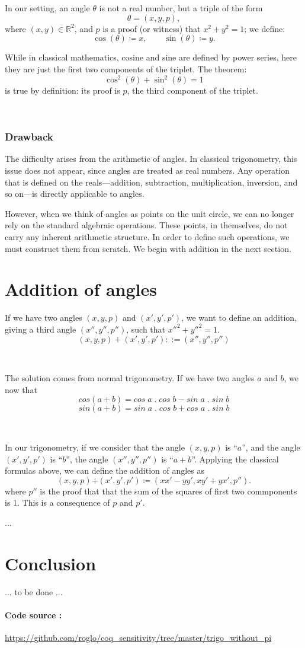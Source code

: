 \documentclass[11pt]{article}
\theoremstyle{definition}
\begin{document}
\

\

\noindent In our setting, an angle \( \theta \) is not a real number,
but a triple of the form
\[
\theta = (x, y, p),
\]
where \( (x, y) \in \mathbb{R}^2 \), and \( p \) is a proof (or
witness) that \( x^2 + y^2 = 1 \); we define:
\[
\cos(\theta) \coloneqq x, \qquad \sin(\theta) \coloneqq y.
\]

\noindent While in classical mathematics, cosine and sine are defined
by power series, here they are just the first two components of the
triplet. The theorem:
\[
\cos^2(\theta) + \sin^2(\theta) = 1
\]
is true by definition: its proof is $p$, the third component of the
triplet.

\

\subsubsection*{Drawback}

The difficulty arises from the arithmetic of angles. In classical
trigonometry, this issue does not appear, since angles are treated as
real numbers. Any operation that is defined on the reals—addition,
subtraction, multiplication, inversion, and so on—is directly
applicable to angles.

However, when we think of angles as points on the unit circle, we can
no longer rely on the standard algebraic operations. These points, in
themselves, do not carry any inherent arithmetic structure. In order
to define such operations, we must construct them from scratch. We
begin with addition in the next section.

\section{Addition of angles}

If we have two angles $(x, y, p)$ and $(x', y', p')$, we want to
define an addition, giving a third angle $(x'', y'', p'')$, such that
$x''^2+y''^2=1$.
\[
(x, y, p) + (x', y', p') ::= (x'', y'', p'')
\]

\

\noindent The solution comes from normal trigonometry. If we have two
angles $a$ and $b$, we now that
\[
cos(a+b) = cos\;a\;.\;cos\;b - sin\;a\;.\;sin\;b
\]
\[
sin(a+b) = sin\;a\;.\;cos\;b + cos\;a\;.\;sin\;b
\]

\

\noindent In our trigonometry, if we consider that the angle $(x, y,
p)$ is ``$a$'', and the angle $(x', y', p')$ is ``$b$'', the angle
$(x'', y'', p'')$ is ``$a + b$''. Applying the classical formulas
above, we can define the addition of angles as
\[
(x, y, p) \boldsymbol{+} (x', y', p') \coloneqq (x x' - y y', x y' + y
x', p'').
\]
where $p''$ is the proof that that the sum of the squares of first two
commponents is 1. This is a consequence of $p$ and $p'$.

...

\section{Conclusion}

... to be done ...

\paragraph{Code source :}
\url{https://github.com/roglo/coq_sensitivity/tree/master/trigo_without_pi}
\end{document}
